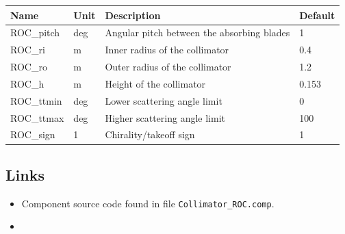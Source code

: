 \begin{longtable}{p{}p{}p{}p{}}
\toprule
\textbf{Name} & \textbf{Unit} & \textbf{Description} & \textbf{Default} \\
\midrule
\endhead
ROC\_pitch & deg & Angular pitch between the absorbing blades & 1 \\
ROC\_ri & m & Inner radius of the collimator & 0.4 \\
ROC\_ro & m & Outer radius of the collimator & 1.2 \\
ROC\_h & m & Height of the collimator & 0.153 \\
ROC\_ttmin & deg & Lower scattering angle limit & 0 \\
ROC\_ttmax & deg & Higher scattering angle limit & 100 \\
ROC\_sign & 1 & Chirality/takeoff sign & 1 \\
\bottomrule
\end{longtable}

\subsection*{Links}
\begin{itemize}
  \item Component source code found in file \texttt{Collimator\_ROC.comp}.
  \item {}
\end{itemize}
